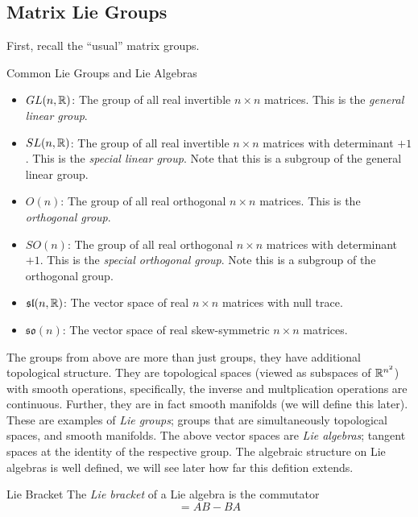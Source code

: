 \subsection{Matrix Lie Groups}
First, recall the ``usual'' matrix groups.
\begin{boxdef}{Common Lie Groups and Lie Algebras}{}
    \begin{itemize}
        \item $GL(n, \mathbb{R})$: The group of all real invertible $n \times n$ matrices.
        This is the \textit{general linear group}.
        \item $SL(n, \mathbb{R})$: The group of all real invertible $n \times n$ matrices
        with determinant $+1$. This is the \textit{special linear group}. Note that
        this is a subgroup of the general linear group.
        \item $O(n)$: The group of all real orthogonal $n\times n$ matrices. This is the
        \textit{orthogonal group}.
        \item $SO(n)$: The group of all real orthogonal $n\times n$ matrices with determinant
        $+1$. This is the \textit{special orthogonal group}. Note this is a subgroup
        of the orthogonal group.
        \item $\mathfrak{sl}(n, \mathbb{R})$: The vector space of real $n \times n$ matrices with
        null trace.
        \item $\mathfrak{so}(n)$: The vector space of real skew-symmetric $n \times n$
        matrices.
    \end{itemize}
\end{boxdef}

The groups from above are more than just groups, they have additional topological
structure. They are topological spaces (viewed as subspaces of $\mathbb{R}^{n^2}$) with
smooth operations, specifically, the inverse and multplication operations are 
continuous. Further, they are in fact smooth manifolds (we will define this later).
These are examples of \textit{Lie groups}; groups that are simultaneously topological
spaces, and smooth manifolds. The above vector spaces are \textit{Lie algebras};
tangent spaces at the identity of the respective group. The algebraic structure
on Lie algebras is well defined, we will see later how far this defition extends.

\begin{boxdef}{Lie Bracket}{}
    The \textit{Lie bracket} of a Lie algebra is the commutator
    \begin{equation*}
        [A, B] = AB - BA
    \end{equation*}
\end{boxdef}

